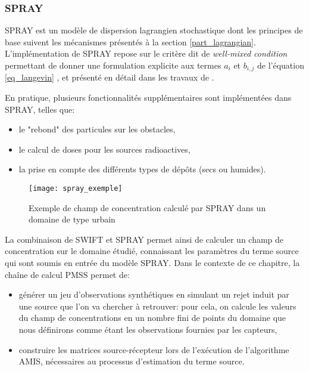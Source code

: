 \subsubsection{SPRAY}

SPRAY est un modèle de dispersion lagrangien stochastique dont les principes de base suivent les mécanismes présentés à la section \ref{part_lagrangian}. L'implémentation de SPRAY repose sur le critère dit de \textit{well-mixed condition} permettant de donner une formulation explicite aux termes $a_i$ et $b_{i,j}$ de l'équation \eqref{eq_langevin} , et présenté en détail dans les travaux de \cite{Thomson1987}.

En pratique, plusieurs fonctionnalités supplémentaires sont implémentées dans SPRAY, telles que: \\

\begin{itemize}
	\item le "rebond" des particules sur les obstacles,
	\item le calcul de doses pour les sources radioactives,
	\item la prise en compte des différents types de dépôts (secs ou humides).\\
\end{itemize}

\begin{figure}[h!]
	\centering
	\texttt{[image: spray\_exemple]}
	\caption{Exemple de champ de concentration calculé par SPRAY dans un domaine de type urbain}
	\label{fig_spray_exemple}
\end{figure}

La combinaison de SWIFT et SPRAY permet ainsi de calculer un champ de concentration sur le domaine étudié, connaissant les paramètres du terme source qui sont soumis en entrée du modèle SPRAY. Dans le contexte de ce chapitre, la chaîne de calcul PMSS permet de:

\begin{itemize}
	\item générer un jeu d'observations synthétiques en simulant un rejet induit par une source que l'on va chercher à retrouver: pour cela, on calcule les valeurs du champ de concentrations en un nombre fini de points du domaine que nous définirons comme étant les observations fournies par les capteurs,
	\item construire les matrices source-récepteur lors de l'exécution de l'algorithme AMIS, nécessaires au processus d'estimation du terme source.\\
\end{itemize}

